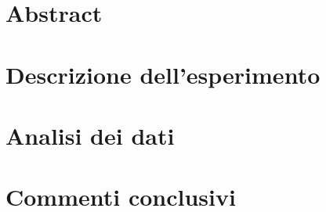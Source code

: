 \documentclass[a4paper,11pt]{article}
\begin{document}
	\tableofcontents
	
	\vspace{2cm}
	\section{Abstract}
	\newpage
	\twocolumn
	
	
	
	\section{Descrizione dell'esperimento}
	\section{Analisi dei dati}

			
	\section{Commenti conclusivi}
	
	\newpage
	\onecolumn
\end{document}
